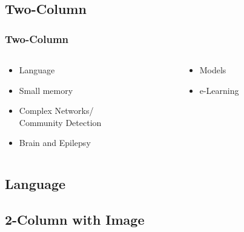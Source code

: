\documentclass{beamer}
\begin{document}
\subsection{Two-Column}




\begin{frame}\frametitle{Two-Column}
	\begin{columns}[T]
	\begin{column}{.5\linewidth}   
	    	\begin{itemize}
		
			\item
			Language
		
			\item
			Small memory
		
			\item
			Complex Networks/\\Community Detection
		
			\item
			Brain and Epilepsy
		\end{itemize}
	\end{column}
	\begin{column}{.5\linewidth}
	    	\begin{itemize}
		
			\item
			Models
		
			\item
			e-Learning
			
		\end{itemize}
	\end{column}
	\end{columns}
\end{frame}




\subsection{Language}




\subsection{2-Column with Image}
\end{document}
